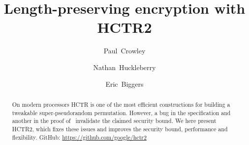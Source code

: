 \documentclass[letterpaper,11pt]{article}
\author{Paul~Crowley}
\author{Nathan~Huckleberry}
\author{Eric~Biggers}
\affil{Google}
\title{Length-preserving encryption with HCTR2}
\begin{document}
\maketitle

\begin{abstract}
On modern processors HCTR\cite{hctr} is
one of the most efficient constructions
for building a tweakable super-pseudorandom permutation. However,
a bug in the specification and another in the proof of~\cite{hctrquad}
invalidate the claimed security bound. We here present HCTR2,
which fixes these issues and improves the
security bound, performance and flexibility.
GitHub: \url{https://github.com/google/hctr2}
\end{abstract}


\newpage

\newpage





\printbibliography[heading=bibintoc]
\appendix

%
\end{document}
